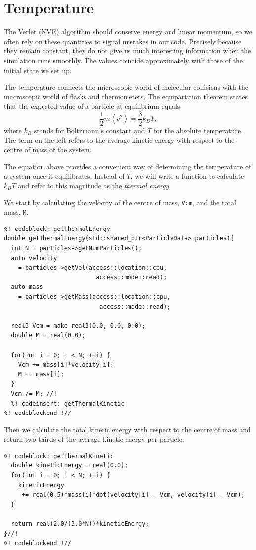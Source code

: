 \section{Temperature}

The Verlet (NVE) algorithm should conserve energy and linear momentum, so we 
often rely on these quantities to signal mistakes in our code. Precisely because 
they remain constant, they do not give us much interesting information when the 
simulation runs smoothly. The values coincide approximately with those of the 
initial state we set up.

The temperature connects the microscopic world of molecular collisions with the 
macroscopic world of flasks and thermometers. The equipartition theorem states 
that the expected value of a particle at equilibrium equals
\begin{equation*}
  \frac{1}{2} m \left\langle v^2 \right\rangle = \frac{3}{2}k_B T,
\end{equation*}
where $k_B$ stands for Boltzmann's constant and $T$ for the absolute 
temperature. The term on the left refers to the average kinetic energy with 
respect to the centre of mass of the system.

The equation above provides a convenient way of determining the temperature of a 
system once it equilibrates. Instead of $T$, we will write a function to 
calculate $k_BT$ and refer to this magnitude as the \textit{thermal energy}.

We start by calculating the velocity of the centre of mass, \texttt{Vcm}, and 
the total mass, \texttt{M}.
\begin{lstlisting}
%! codeblock: getThermalEnergy
double getThermalEnergy(std::shared_ptr<ParticleData> particles){
  int N = particles->getNumParticles();
  auto velocity
    = particles->getVel(access::location::cpu,
                          access::mode::read);
  auto mass
    = particles->getMass(access::location::cpu,
                           access::mode::read);

  real3 Vcm = make_real3(0.0, 0.0, 0.0);
  double M = real(0.0);

  for(int i = 0; i < N; ++i) {
    Vcm += mass[i]*velocity[i];
    M += mass[i];
  }
  Vcm /= M; //!
  %! codeinsert: getThermalKinetic
%! codeblockend !//
\end{lstlisting}
Then we calculate the total kinetic energy with respect to the centre of mass 
and return two thirds of the average kinetic energy per particle.
\begin{lstlisting}
%! codeblock: getThermalKinetic
  double kineticEnergy = real(0.0);
  for(int i = 0; i < N; ++i) {
    kineticEnergy
     += real(0.5)*mass[i]*dot(velocity[i] - Vcm, velocity[i] - Vcm);
  }

  return real(2.0/(3.0*N))*kineticEnergy;
}//!
%! codeblockend !//
\end{lstlisting}

